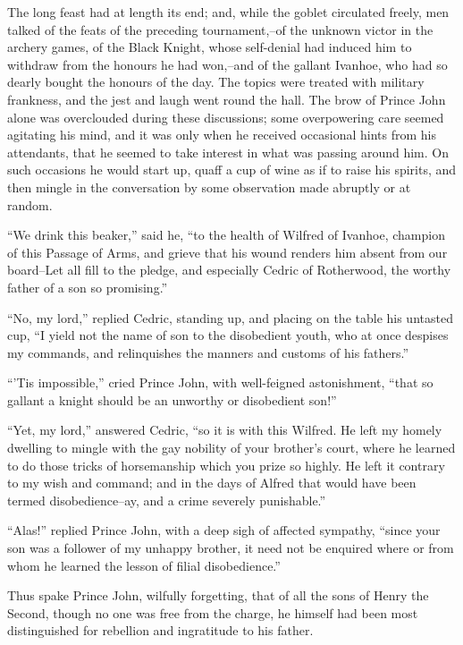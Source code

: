 The long feast had at length its end; and, while the goblet circulated
freely, men talked of the feats of the preceding tournament,--of the
unknown victor in the archery games, of the Black Knight, whose
self-denial had induced him to withdraw from the honours he had
won,--and of the gallant Ivanhoe, who had so dearly bought the honours
of the day. The topics were treated with military frankness, and the
jest and laugh went round the hall. The brow of Prince John alone was
overclouded during these discussions; some overpowering care seemed
agitating his mind, and it was only when he received occasional hints
from his attendants, that he seemed to take interest in what was passing
around him. On such occasions he would start up, quaff a cup of wine as
if to raise his spirits, and then mingle in the conversation by some
observation made abruptly or at random.

``We drink this beaker,'' said he, ``to the health of Wilfred of
Ivanhoe, champion of this Passage of Arms, and grieve that his wound
renders him absent from our board--Let all fill to the pledge, and
especially Cedric of Rotherwood, the worthy father of a son so
promising.''

``No, my lord,'' replied Cedric, standing up, and placing on the table
his untasted cup, ``I yield not the name of son to the disobedient
youth, who at once despises my commands, and relinquishes the manners
and customs of his fathers.''

``'Tis impossible,'' cried Prince John, with well-feigned astonishment,
``that so gallant a knight should be an unworthy or disobedient son!''

``Yet, my lord,'' answered Cedric, ``so it is with this Wilfred. He left
my homely dwelling to mingle with the gay nobility of your brother's
court, where he learned to do those tricks of horsemanship which you
prize so highly. He left it contrary to my wish and command; and in the
days of Alfred that would have been termed disobedience--ay, and a crime
severely punishable.''

``Alas!'' replied Prince John, with a deep sigh of affected sympathy,
``since your son was a follower of my unhappy brother, it need not be
enquired where or from whom he learned the lesson of filial
disobedience.''

Thus spake Prince John, wilfully forgetting, that of all the sons of
Henry the Second, though no one was free from the charge, he himself had
been most distinguished for rebellion and ingratitude to his father.

